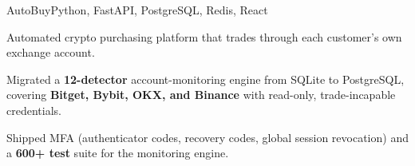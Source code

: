\begin{cvproject}{AutoBuy}{Python, FastAPI, PostgreSQL, Redis, React}
  \item Automated crypto purchasing platform that trades through each customer's own exchange account.
  \item Migrated a \textbf{12-detector} account-monitoring engine from SQLite to PostgreSQL, covering \textbf{Bitget, Bybit, OKX, and Binance} with read-only, trade-incapable credentials.
  \item Shipped MFA (authenticator codes, recovery codes, global session revocation) and a \textbf{600+ test} suite for the monitoring engine.
\end{cvproject}
